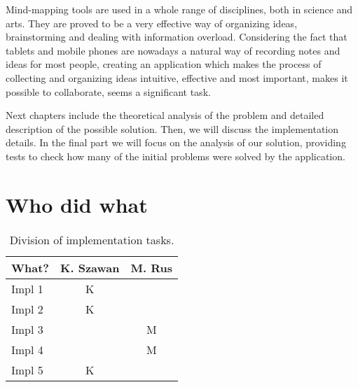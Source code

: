 
Mind-mapping tools are used in a whole range of disciplines, both in science and arts. They are proved to be a very effective way of organizing ideas, brainstorming and dealing with information overload. Considering the fact that tablets and mobile phones are nowadays a natural way of recording notes and ideas for most people, creating an application which makes the process of collecting and organizing ideas intuitive, effective and most important, makes it possible to collaborate, seems a significant task.


Next chapters include the theoretical analysis of the problem and detailed description of the possible solution. Then, we will discuss the implementation details. In the final part we will focus on the analysis of our solution, providing tests to check how many of the initial problems were solved by the application.

\section{Who did what}
\label{sec:who-did-what}


\begin{table}[h]
	\centering
	\begin{tabular}{l|c|c}
		What? & K. Szawan & M. Rus \\
		\hline
		Impl 1 & K & \\
		Impl 2 & K & \\
		Impl 3 & & M\\
		Impl 4 & & M\\
		Impl 5 & K & \\
	\end{tabular}
	\caption{Division of implementation tasks.}
	\label{tab:who-did-impl}
\end{table}


